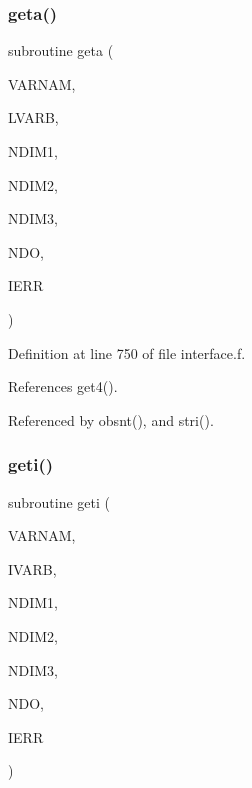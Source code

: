 \mbox{\label{interface_8f_a39a634569e6241065eed8f5127700250}} 
\subsubsection{\texorpdfstring{geta()}{geta()}}
{\footnotesize\ttfamily subroutine geta (\begin{DoxyParamCaption}\item[{character$\ast$14}]{V\+A\+R\+N\+AM,  }\item[{integer$\ast$2, dimension(4,20)}]{L\+V\+A\+RB,  }\item[{integer$\ast$2}]{N\+D\+I\+M1,  }\item[{integer$\ast$2}]{N\+D\+I\+M2,  }\item[{integer$\ast$2}]{N\+D\+I\+M3,  }\item[{integer$\ast$2}]{N\+DO,  }\item[{integer$\ast$2}]{I\+E\+RR }\end{DoxyParamCaption})}



Definition at line 750 of file interface.\+f.



References get4().



Referenced by obsnt(), and stri().

\mbox{\label{interface_8f_a3ae66a60ec1589dc5a59d4e0504b3b0c}} 
\subsubsection{\texorpdfstring{geti()}{geti()}}
{\footnotesize\ttfamily subroutine geti (\begin{DoxyParamCaption}\item[{character$\ast$14}]{V\+A\+R\+N\+AM,  }\item[{integer$\ast$2, dimension(ndim1,ndim2,ndim3)}]{I\+V\+A\+RB,  }\item[{integer$\ast$2}]{N\+D\+I\+M1,  }\item[{integer$\ast$2}]{N\+D\+I\+M2,  }\item[{integer$\ast$2}]{N\+D\+I\+M3,  }\item[{integer$\ast$2}]{N\+DO,  }\item[{integer$\ast$2}]{I\+E\+RR }\end{DoxyParamCaption})}



